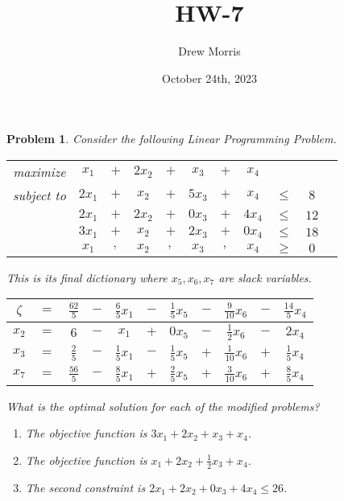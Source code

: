 \documentclass[12pt,oneside]{amsart}
\title{HW-7}
\author{Drew Morris}
\date{October 24th, 2023}
\numberwithin{equation}{section}
\numberwithin{figure}{section}
\theoremstyle{plain}
\newtheorem{prob}{Problem}
\theoremstyle{definition}
\begin{document}
\maketitle

\begin{prob}
Consider the following Linear Programming Problem. \\
\begin{center}\begin{tabular}{ccccccccccc}
  maximize   & $x_1$  & $+$ & $2x_2$ & $+$ & $x_3$  & $+$ & $x_4$  &        &      \\
  subject to & $2x_1$ & $+$ & $x_2$  & $+$ & $5x_3$ & $+$ & $x_4$  & $\leq$ & $8$  \\
             & $2x_1$ & $+$ & $2x_2$ & $+$ & $0x_3$ & $+$ & $4x_4$ & $\leq$ & $12$ \\
             & $3x_1$ & $+$ & $x_2$  & $+$ & $2x_3$ & $+$ & $0x_4$ & $\leq$ & $18$ \\
             & $x_1$  & $,$ & $x_2$  & $,$ & $x_3$  & $,$ & $x_4$  & $\geq$ & $0$  \\
\end{tabular}\end{center}
This is its final dictionary where $x_5,x_6,x_7$ are slack variables. \\
\begin{center}\begin{tabular}{|ccccccccccc|}
  \hline
  $\zeta$ & $=$ & $\frac{62}{5}$ & $-$ & $\frac{6}{5}x_1$ & $-$ & $\frac{1}{5}x_5$ & $-$ & $\frac{9}{10}x_6$ & $-$ & $\frac{14}{5}x_4$ \\
  \hline
  $x_2$   & $=$ & $6$            & $-$ & $x_1$            & $+$ & $0x_5$           & $-$ & $\frac{1}{2}x_6$  & $-$ & $2x_4$            \\
  $x_3$   & $=$ & $\frac{2}{5}$  & $-$ & $\frac{1}{5}x_1$ & $-$ & $\frac{1}{5}x_5$ & $+$ & $\frac{1}{10}x_6$ & $+$ & $\frac{1}{5}x_4$  \\
  $x_7$   & $=$ & $\frac{56}{5}$ & $-$ & $\frac{8}{5}x_1$ & $+$ & $\frac{2}{5}x_5$ & $+$ & $\frac{3}{10}x_6$ & $+$ & $\frac{8}{5}x_4$  \\
  \hline
\end{tabular}\end{center}
What is the optimal solution for each of the modified problems? \\
\begin{enumerate}
  \item The objective function is $3x_1 + 2x_2 + x_3 + x_4$. \\
  \item The objective function is $x_1 + 2x_2 + \frac{1}{2}x_3 + x_4$. \\
  \item The second constraint is $2x_1 + 2x_2 + 0x_3 + 4x_4 \leq 26$. \\
\end{enumerate}
\end{prob}
\end{document}
